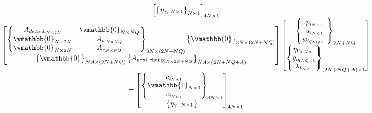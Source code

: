 \documentclass[letterpaper, 10pt, conference]{IEEEtran}
\begin{document}
\begin{equation}
\begin{array}{c}
\begin{bmatrix}
    \begin{Bmatrix}
	\eta_{\gamma_{i}\; N \times 1} \\
    \end{Bmatrix}_{N \times 1}
\end{bmatrix}_{4N \times 1} \\
\begin{bmatrix}
    \begin{Bmatrix}
	A_{detach_{N \times 2N}}    & \vmathbb{0}_{N \times NQ} \\
	\vmathbb{0}_{N \times 2N} & A_{w_{N \times NQ}}          \\
	\vmathbb{0}_{N \times 2N} & A_{v_{N \times NQ}}          \\
    \end{Bmatrix}_{3N \times (2N + NQ)}
    \begin{Bmatrix}
	\vmathbb{0}
    \end{Bmatrix}_{3N \times (2N + NQ)} \\
    \begin{Bmatrix}
	\vmathbb{0}_{}
    \end{Bmatrix}_{NA \times (2N + NQ)}
    \begin{Bmatrix}
	A_{\textrm{next charge}_{N \times 2N + NQ}}
    \end{Bmatrix}_{NA \times (2N + NQ + A)} \\
\end{bmatrix}
\begin{bmatrix}
    \begin{Bmatrix}
	p_{i_{N \times 1}} \\
	u_{i_{N \times 1}} \\
	w_{iq_{NQ \times 1}} \\
    \end{Bmatrix}_{2N + NQ} \\
    \begin{Bmatrix}
	\eta_{\Gamma_{i\; N \times 1}} \\
	g_{iq_{NQ \times 1}}           \\
	\lambda_{i_{N \times 1}}       \\
    \end{Bmatrix}_{(2N + NQ + A) \times 1}
\end{bmatrix} \\
=
\begin{bmatrix}
    \begin{Bmatrix}
	c_{i_{N \times 1}} \\
	\vmathbb{1}_{N \times 1} \\
	v_{i_{N \times 1}} \\
    \end{Bmatrix}_{3N \times 1} \\
    \begin{Bmatrix}
	\eta_{\gamma_{i}\; N \times 1} \\
    \end{Bmatrix}
\end{bmatrix}_{4N \times 1}
\end{array}
\end{equation}




\end{document}
